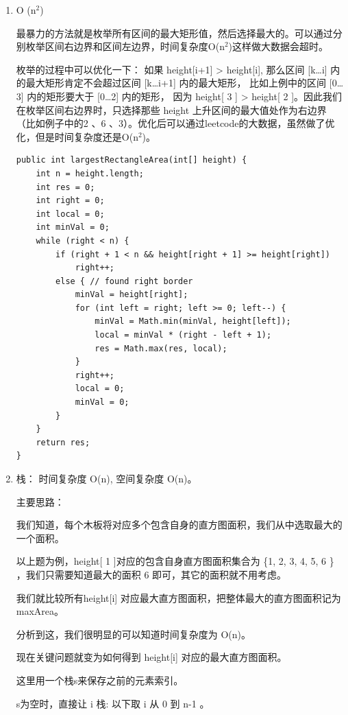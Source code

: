 \documentclass[12pt]{book}
\begin{document}
\begin{enumerate}
\item O (n$^{\text{2}}$)
\label{sec-5-3-3-1}

最暴力的方法就是枚举所有区间的最大矩形值，然后选择最大的。可以通过分别枚举区间右边界和区间左边界，时间复杂度O(n$^{\text{2}}$)这样做大数据会超时。

枚举的过程中可以优化一下： 如果 height[i+1] > height[i], 那么区间 [k\ldots{}i] 内的最大矩形肯定不会超过区间 [k\ldots{}i+1] 内的最大矩形， 比如上例中的区间 [0\ldots{}3] 内的矩形要大于 [0\ldots{}2] 内的矩形， 因为 height[ 3 ] > height[ 2 ]。因此我们在枚举区间右边界时，只选择那些 height 上升区间的最大值处作为右边界（比如例子中的2 、6 、3）。优化后可以通过leetcode的大数据，虽然做了优化，但是时间复杂度还是O(n$^{\text{2}}$)。

\lstset{language=java,label= ,caption= ,numbers=none}
\begin{lstlisting}
public int largestRectangleArea(int[] height) {
    int n = height.length;
    int res = 0;
    int right = 0;
    int local = 0;
    int minVal = 0;
    while (right < n) {
        if (right + 1 < n && height[right + 1] >= height[right])
            right++;
        else { // found right border
            minVal = height[right];
            for (int left = right; left >= 0; left--) {
                minVal = Math.min(minVal, height[left]);
                local = minVal * (right - left + 1);
                res = Math.max(res, local);
            }
            right++;
            local = 0;
            minVal = 0;
        }
    }
    return res;
}
\end{lstlisting}

\item 栈： 时间复杂度 O(n), 空间复杂度 O(n)。
\label{sec-5-3-3-2}

主要思路：

我们知道，每个木板将对应多个包含自身的直方图面积，我们从中选取最大的一个面积。

以上题为例，height[ 1 ]对应的包含自身直方图面积集合为 \{1, 2, 3, 4, 5, 6 \} ，我们只需要知道最大的面积 6 即可，其它的面积就不用考虑。

我们就比较所有height[i] 对应最大直方图面积，把整体最大的直方图面积记为maxArea。

分析到这，我们很明显的可以知道时间复杂度为 O(n)。

现在关键问题就变为如何得到 height[i] 对应的最大直方图面积。

这里用一个栈s来保存之前的元素索引。

s为空时，直接让 i 栈: 以下取 i 从 0 到 n-1 。


\end{enumerate}
\end{document}
